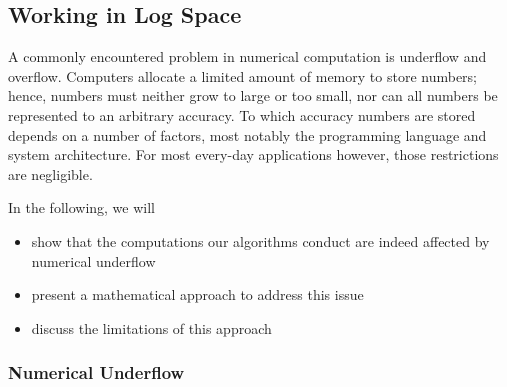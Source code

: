 \subsection{Working in Log Space}

A commonly encountered problem in numerical computation is underflow and overflow. Computers allocate a limited amount of memory to store numbers; hence, numbers must neither grow to large or too small, nor can all numbers be represented to an arbitrary accuracy. To which accuracy numbers are stored depends on a number of factors, most notably the programming language and system architecture. For most every-day applications however, those restrictions are negligible. 

In the following, we will 
\begin{itemize}
	\item show that the computations our algorithms conduct are indeed affected by numerical underflow
	\item present a mathematical approach to address this issue
	\item discuss the limitations of this approach
\end{itemize}


\subsubsection*{Numerical Underflow}
